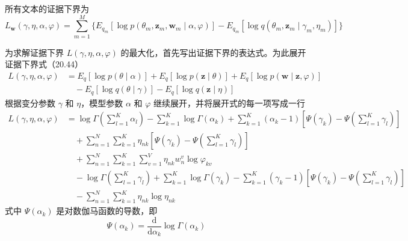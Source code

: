 \documentclass[UTF8,12pt,a4paper,fontset=fandol]{ctexart}
\begin{document}
所有文本的证据下界为
\begin{equation}
L_{\mathbf{w}}(\gamma,\eta,\alpha,\varphi)=\sum_{m=1}^M \{E_{q_m}[\log p(\theta_m,\mathbf{z}_m,\mathbf{w}_m\mid\alpha,\varphi)]-E_{q_m}[\log q(\theta_m,\mathbf{z}_m\mid\gamma_m,\eta_m)]\}
\tag{20.45}
\end{equation}

为求解证据下界 $L(\gamma,\eta,\alpha,\varphi)$ 的最大化，首先写出证据下界的表达式。为此展开证据下界式（20.44）
\begin{equation}
\begin{aligned}
L(\gamma,\eta,\alpha,\varphi)
&=E_q[\log p(\theta\mid\alpha)]+E_q[\log p(\mathbf{z}\mid\theta)]+E_q[\log p(\mathbf{w}\mid\mathbf{z},\varphi)]\\
&\quad -E_q[\log q(\theta\mid\gamma)]-E_q[\log q(\mathbf{z}\mid\eta)]
\end{aligned}
\tag{20.46}
\end{equation}
根据变分参数 $\gamma$ 和 $\eta$，模型参数 $\alpha$ 和 $\varphi$ 继续展开，并将展开式的每一项写成一行
\begin{equation}
\begin{aligned}
L(\gamma,\eta,\alpha,\varphi)
&=\log\Gamma\left(\sum_{l=1}^K\alpha_l\right)-\sum_{k=1}^K\log\Gamma(\alpha_k)
+\sum_{k=1}^K(\alpha_k-1)\left[\Psi(\gamma_k)-\Psi\left(\sum_{l=1}^K\gamma_l\right)\right]\\
&\quad +\sum_{n=1}^N\sum_{k=1}^K\eta_{nk}\left[\Psi(\gamma_k)-\Psi\left(\sum_{l=1}^K\gamma_l\right)\right]\\
&\quad +\sum_{n=1}^N\sum_{k=1}^K\sum_{v=1}^V \eta_{nk}w_n^v\log\varphi_{kv}\\
&\quad -\log\Gamma\left(\sum_{l=1}^K\gamma_l\right)+\sum_{k=1}^K\log\Gamma(\gamma_k)
-\sum_{k=1}^K(\gamma_k-1)\left[\Psi(\gamma_k)-\Psi\left(\sum_{l=1}^K\gamma_l\right)\right]\\
&\quad -\sum_{n=1}^N\sum_{k=1}^K\eta_{nk}\log\eta_{nk}
\end{aligned}
\tag{20.47}
\end{equation}
式中 $\Psi(\alpha_k)$ 是对数伽马函数的导数，即
\begin{equation}
\Psi(\alpha_k)=\frac{\mathrm{d}}{\mathrm{d}\alpha_k}\log\Gamma(\alpha_k)
\tag{20.48}
\end{equation}
\end{document}
